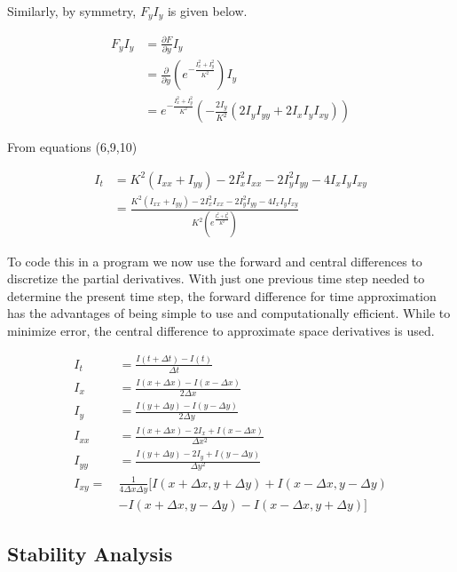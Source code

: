 \documentclass{article}
\begin{document}
Similarly, by symmetry, $F_{y}I_y$ is given below.

\begin{align}
F_{y}I_y &= \frac{\partial F}{\partial y} I_y \\
         &= \frac{\partial}{\partial y} \left( e^{-\frac{I_x^2 + I_y^2}{K^2}} \right) I_y \\
         &= e^{-\frac{I_x^2 + I_y^2}{K^2}} \left( -\frac{2I_y}{K^2}(2I_yI_{yy} + 2I_xI_yI_{xy}) \right) \tag{11}
\end{align}

From equations (6,9,10)

\begin{align}
I_t &= K^2(I_{xx} + I_{yy}) - 2I_x^2I_{xx} - 2I_y^2I_{yy} - 4I_xI_yI_{xy} \\
    &= \frac{K^2(I_{xx} + I_{yy}) - 2I_x^2I_{xx} - 2I_y^2I_{yy} - 4I_xI_yI_{xy}}{K^2(e^{\frac{I_x^2 + I_y^2}{K^2}})} \tag{12}
\end{align}

To code this in a program we now use the forward and central differences to discretize the partial derivatives. With just one previous time step needed to determine the present time step, the forward difference for time approximation has the advantages of being simple to use and computationally efficient. While to minimize error, the central difference to approximate space derivatives is used.

\begin{align}
I_t &= \frac{I(t + \Delta t) - I(t)}{\Delta t} \\
I_x &= \frac{I(x + \Delta x) - I(x - \Delta x)}{2\Delta x} \\
I_y &= \frac{I(y + \Delta y) - I(y - \Delta y)}{2\Delta y} \\
I_{xx} &= \frac{I(x + \Delta x) - 2I_x + I(x - \Delta x)}{\Delta x^2} \\
I_{yy} &= \frac{I(y + \Delta y) - 2I_y + I(y - \Delta y)}{\Delta y^2} \\
I_{xy} =\ &\frac{1}{4\Delta x\Delta y}\big[I(x + \Delta x, y + \Delta y) + I(x - \Delta x, y - \Delta y) \nonumber \\
&- I(x + \Delta x, y - \Delta y) - I(x - \Delta x, y + \Delta y)\big] \tag{13}
\end{align}

\subsection{Stability Analysis}
\end{document}
